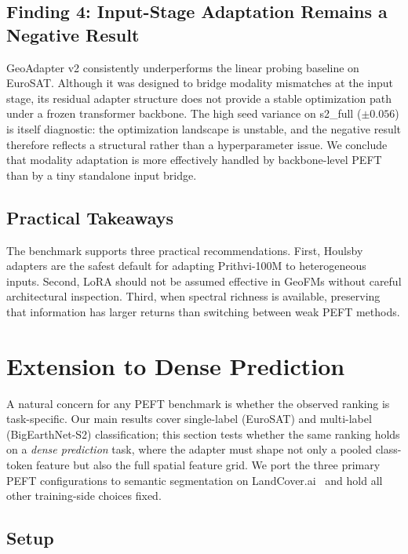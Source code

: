 \documentclass[11pt]{article}
\begin{document}
\subsection{Finding 4: Input-Stage Adaptation Remains a Negative Result}
GeoAdapter v2 consistently underperforms the linear probing baseline on EuroSAT. Although it was designed to bridge modality mismatches at the input stage, its residual adapter structure does not provide a stable optimization path under a frozen transformer backbone. The high seed variance on s2\_full ($\pm 0.056$) is itself diagnostic: the optimization landscape is unstable, and the negative result therefore reflects a structural rather than a hyperparameter issue. We conclude that modality adaptation is more effectively handled by backbone-level PEFT than by a tiny standalone input bridge.

\subsection{Practical Takeaways}
The benchmark supports three practical recommendations. First, Houlsby adapters are the safest default for adapting Prithvi-100M to heterogeneous inputs. Second, LoRA should not be assumed effective in GeoFMs without careful architectural inspection. Third, when spectral richness is available, preserving that information has larger returns than switching between weak PEFT methods.
\section{Extension to Dense Prediction}
\label{sec:segmentation}

A natural concern for any PEFT benchmark is whether the observed ranking is task-specific. Our main results cover single-label (EuroSAT) and multi-label (BigEarthNet-S2) classification; this section tests whether the same ranking holds on a \emph{dense prediction} task, where the adapter must shape not only a pooled class-token feature but also the full spatial feature grid. We port the three primary PEFT configurations to semantic segmentation on LandCover.ai~\cite{boguszewski2021landcoverai} and hold all other training-side choices fixed.

\subsection{Setup}
\end{document}
